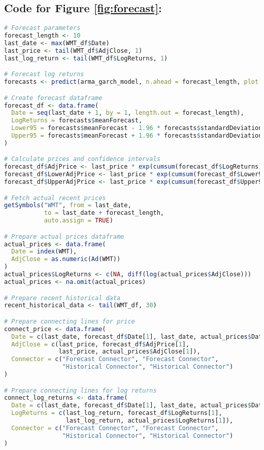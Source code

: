 \documentclass{article}
\newcommand{\1}{\mathbbm{1}}
\theoremstyle{definition}
\begin{document}
\subsection{Code for Figure \ref{fig:forecast}:}
\label{subsec:forecast}

\begin{lstlisting}[language=R]
# Forecast parameters
forecast_length <- 10
last_date <- max(WMT_df$Date)
last_price <- tail(WMT_df$AdjClose, 1)
last_log_return <- tail(WMT_df$LogReturns, 1)

# Forecast log returns
forecasts <- predict(arma_garch_model, n.ahead = forecast_length, plot = FALSE)

# Create forecast dataframe
forecast_df <- data.frame(
  Date = seq(last_date + 1, by = 1, length.out = forecast_length),
  LogReturns = forecasts$meanForecast,
  Lower95 = forecasts$meanForecast - 1.96 * forecasts$standardDeviation,
  Upper95 = forecasts$meanForecast + 1.96 * forecasts$standardDeviation
)

# Calculate prices and confidence intervals
forecast_df$AdjPrice <- last_price * exp(cumsum(forecast_df$LogReturns))
forecast_df$LowerAdjPrice <- last_price * exp(cumsum(forecast_df$Lower95))
forecast_df$UpperAdjPrice <- last_price * exp(cumsum(forecast_df$Upper95))

# Fetch actual recent prices
getSymbols("WMT", from = last_date, 
           to = last_date + forecast_length, 
           auto.assign = TRUE)

# Prepare actual prices dataframe
actual_prices <- data.frame(
  Date = index(WMT),
  AdjClose = as.numeric(Ad(WMT))
)
actual_prices$LogReturns <- c(NA, diff(log(actual_prices$AdjClose)))
actual_prices <- na.omit(actual_prices)

# Prepare recent historical data
recent_historical_data <- tail(WMT_df, 30)

# Prepare connecting lines for price
connect_price <- data.frame(
  Date = c(last_date, forecast_df$Date[1], last_date, actual_prices$Date[1]),
  AdjClose = c(last_price, forecast_df$AdjPrice[1], 
               last_price, actual_prices$AdjClose[1]),
  Connector = c("Forecast Connector", "Forecast Connector", 
                "Historical Connector", "Historical Connector")
)

# Prepare connecting lines for log returns
connect_log_returns <- data.frame(
  Date = c(last_date, forecast_df$Date[1], last_date, actual_prices$Date[1]),
  LogReturns = c(last_log_return, forecast_df$LogReturns[1], 
                 last_log_return, actual_prices$LogReturns[1]),
  Connector = c("Forecast Connector", "Forecast Connector", 
                "Historical Connector", "Historical Connector")
)


\end{lstlisting}
\end{document}

